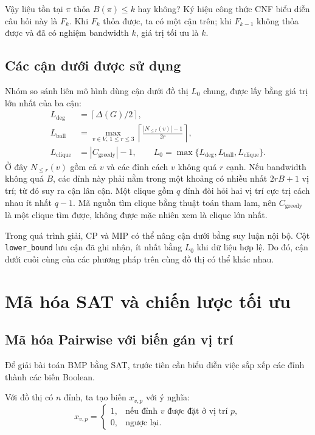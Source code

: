 \documentclass[a4paper,fleqn]{cas-sc}
\newcommand{\code}[1]{\nolinkurl{#1}}
\begin{document}
Vậy liệu tồn tại $\pi$ thỏa $B(\pi)\leq k$ hay không? Ký hiệu công thức CNF biểu diễn câu hỏi này là $F_k$. Khi $F_k$ thỏa được, ta có một cận trên; khi $F_{k-1}$ không thỏa được và đã có nghiệm bandwidth $k$, giá trị tối ưu là $k$.

\subsection{Các cận dưới được sử dụng}
Nhóm so sánh liên mô hình dùng cận dưới đồ thị $L_0$ chung, được lấy bằng giá trị lớn nhất của ba cận:
\begin{align}
 L_{\deg}&=\left\lceil\Delta(G)/2\right\rceil,\nonumber\\
 L_{\mathrm{ball}}&=\max_{v\in V,\,1\leq r\leq3}
       \left\lceil\frac{|N_{\leq r}(v)|-1}{2r}\right\rceil,\nonumber\\
 L_{\mathrm{clique}}&=|C_{\mathrm{greedy}}|-1,\qquad
 L_0=\max\{L_{\deg},L_{\mathrm{ball}},L_{\mathrm{clique}}\}.
\label{eq:bounds}
\end{align}
Ở đây $N_{\leq r}(v)$ gồm cả $v$ và các đỉnh cách $v$ không quá $r$ cạnh. Nếu bandwidth không quá $B$, các đỉnh này phải nằm trong một khoảng có nhiều nhất $2rB+1$ vị trí; từ đó suy ra cận lân cận. Một clique gồm $q$ đỉnh đòi hỏi hai vị trí cực trị cách nhau ít nhất $q-1$. Mã nguồn tìm clique bằng thuật toán tham lam, nên $C_{\mathrm{greedy}}$ là một clique tìm được, không được mặc nhiên xem là clique lớn nhất.

Trong quá trình giải, CP và MIP có thể nâng cận dưới bằng suy luận nội bộ. Cột \code{lower_bound} lưu cận đã ghi nhận, ít nhất bằng $L_0$ khi dữ liệu hợp lệ. Do đó, cận dưới cuối cùng của các phương pháp trên cùng đồ thị có thể khác nhau.

\section{Mã hóa SAT và chiến lược tối ưu}

\subsection{Mã hóa Pairwise với biến gán vị trí}

Để giải bài toán BMP bằng SAT, trước tiên cần biểu diễn việc sắp xếp các đỉnh thành các biến Boolean.

Với đồ thị có $n$ đỉnh, ta tạo biến $x_{v,p}$ với ý nghĩa:
\begin{equation*}
x_{v,p} =
\begin{cases}
1, & \text{nếu đỉnh } v \text{ được đặt ở vị trí } p,\\
0, & \text{ngược lại}.
\end{cases}
\end{equation*}
\end{document}
